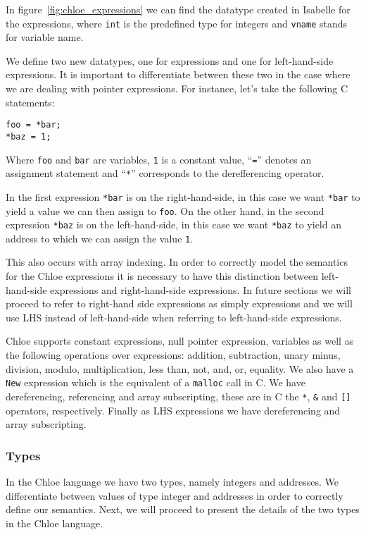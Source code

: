 In figure~\ref{fig:chloe_expressions} we can find the datatype created in Isabelle for the expressions, where \verb|int| is the predefined type for integers and \verb|vname| stands for variable name.

We define two new datatypes, one for expressions and one for left-hand-side expressions.
It is important to differentiate between these two in the case where we are dealing with pointer expressions.
For instance, let's take the following C statements:

\begin{lstlisting}[mathescape=true, frame=single]
foo = *bar;
*baz = 1;
\end{lstlisting}

Where \verb|foo| and \verb|bar| are variables, \verb|1| is a constant value, ``\verb|=|'' denotes an assignment statement and ``\verb|*|'' corresponds to the derefferencing operator.

In the first expression \verb|*bar| is on the right-hand-side, in this case we want \verb|*bar| to yield a value we can then assign to \verb|foo|.
On the other hand, in the second expression \verb|*baz| is on the left-hand-side, in this case we want \verb|*baz| to yield an address to which we can assign the value \verb|1|.

This also occurs with array indexing.
In order to correctly model the semantics for the Chloe expressions it is necessary to have this distinction between left-hand-side expressions and right-hand-side expressions.
In future sections we will proceed to refer to right-hand side expressions as simply expressions and we will use LHS instead of left-hand-side when referring to left-hand-side expressions.

Chloe supports constant expressions, null pointer expression, variables as well as the following operations over expressions: addition, subtraction, unary minus, division, modulo, multiplication, less than, not, and, or, equality.
We also have a \verb|New| expression which is the equivalent of a \verb|malloc| call in C.
We have dereferencing, referencing and array subscripting, these are in C the \verb|*|, \verb|&| and \verb|[]| operators, respectively.
Finally as LHS expressions we have dereferencing and array subscripting.

\subsubsection{Types}

In the Chloe language we have two types, namely integers and addresses.
We differentiate between values of type integer and addresses in order to correctly define our semantics.
Next, we will proceed to present the details of the two types in the Chloe language.

